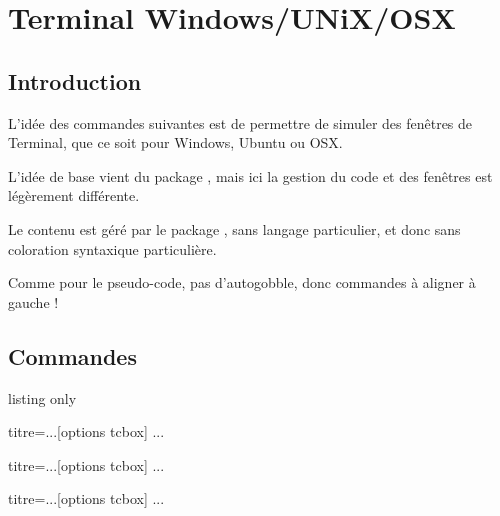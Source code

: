 \documentclass[a4paper,french,11pt]{article}
\newcommand\ctex[1]{\tcbox[vignettelatex]{#1}}
\begin{document}
\newpage

\section{Terminal Windows/UNiX/OSX}\label{terms}

\subsection{Introduction}

\begin{tipblock}
L'idée des \textsf{commandes} suivantes est de permettre de simuler des fenêtres de \textsf{Terminal}, que ce soit pour Windows, Ubuntu ou OSX.

\smallskip

L'idée de base vient du {package} \ctex{termsim}, mais ici la gestion du \textsf{code} et des \textsf{fenêtres} est légèrement différente.

\smallskip

Le \textsf{contenu} est géré par le package \ctex{listings}, sans langage particulier, et donc sans coloration syntaxique particulière.
\end{tipblock}

\begin{warningblock}
Comme pour le pseudo-code, pas d'\textsf{autogobble}, donc commandes à aligner à gauche !
\end{warningblock}

\subsection{Commandes}

\begin{PresCodeTexPL}{listing only}
\begin{TerminalWin}[largeur]{titre=...}[options tcbox]
...
\end{TerminalWin}

\begin{TerminalUnix}[largeur]{titre=...}[options tcbox]
...
\end{TerminalUnix}

\begin{TerminalOSX}[largeur]{titre=...}[options tcbox]
...
\end{TerminalOSX}
\end{PresCodeTexPL}
\end{document}

